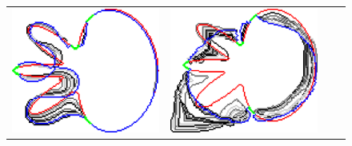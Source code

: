 \begin{figure}
\begin{tabular}{cccc}
\includegraphics[scale=0.2]{figures/chapter9/constrained-elastica/localsearch/flower-1/len_pen-0.0002/radius-7/nc-4/h1.0/summary.pdf} &
\includegraphics[scale=0.2]{figures/chapter9/constrained-elastica/localsearch/flower-1/len_pen-0.0002/radius-50/nc-4/h1.0/summary.pdf} &

\end{tabular}
\end{figure}
